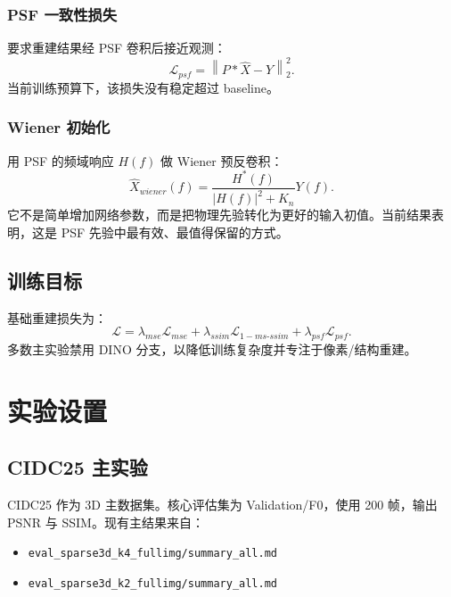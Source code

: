 \documentclass[UTF8, scheme=plain, 11pt, a4paper]{ctexart}
\begin{document}
\subsubsection{PSF 一致性损失}

要求重建结果经 PSF 卷积后接近观测：
\begin{equation}
  \mathcal{L}_{psf} = \left\| P * \hat{X} - Y \right\|_2^2.
\end{equation}
当前训练预算下，该损失没有稳定超过 baseline。

\subsubsection{Wiener 初始化}

用 PSF 的频域响应 $H(f)$ 做 Wiener 预反卷积：
\begin{equation}
  \hat{X}_{wiener}(f) = \frac{H^*(f)}{|H(f)|^2 + K_n}Y(f).
\end{equation}
它不是简单增加网络参数，而是把物理先验转化为更好的输入初值。当前结果表明，这是 PSF 先验中最有效、最值得保留的方式。

\subsection{训练目标}

基础重建损失为：
\begin{equation}
  \mathcal{L} = \lambda_{mse}\mathcal{L}_{mse} + \lambda_{ssim}\mathcal{L}_{1-ms\text{-}ssim} + \lambda_{psf}\mathcal{L}_{psf}.
\end{equation}
多数主实验禁用 DINO 分支，以降低训练复杂度并专注于像素/结构重建。

\section{实验设置}

\subsection{CIDC25 主实验}

CIDC25 作为 3D 主数据集。核心评估集为 Validation/F0，使用 200 帧，输出 PSNR 与 SSIM。现有主结果来自：

\begin{itemize}[leftmargin=*]
  \item \texttt{eval\_sparse3d\_k4\_fullimg/summary\_all.md}
  \item \texttt{eval\_sparse3d\_k2\_fullimg/summary\_all.md}
\end{itemize}
\end{document}
